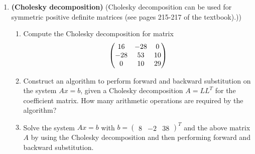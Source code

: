 \documentclass [12pt]{article}
\begin{document}
\begin{enumerate}

\item{{\bf(Cholesky decomposition)} (Cholesky decomposition can be used for symmetric positive definite matrices (see pages 215-217 of the textbook).)})

\begin{enumerate}

\item Compute the Cholesky decomposition for matrix
%
\[
\begin{pmatrix}
16 & -28 & 0 \cr
-28 & 53 & 10 \cr
0 & 10  & 29  
\end{pmatrix}
\]


\item Construct an algorithm to perform forward and backward substitution on the system $Ax=b$, given a Cholesky decomposition $A=LL^T$ for the coefficient matrix. How many arithmetic operations are required by the algorithm?

\item Solve the system $Ax=b$ with $b=\begin{pmatrix}8 & -2 & 38\end{pmatrix}^T$ and the above matrix $A$ by using the Cholesky decomposition and then performing forward and backward substitution.

\end{enumerate}

\end{enumerate}
\end{document}
